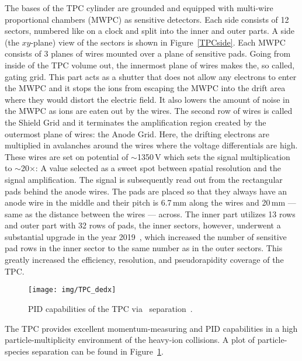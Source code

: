 The bases of the TPC cylinder are grounded and equipped with multi-wire proportional chambers
(MWPC) as sensitive detectors. Each side consists of 12 sectors, numbered like on a clock and split into 
the inner and outer parts. A side (the $xy$-plane) view of the sectors is shown in Figure~\ref{TPCside}\@. Each MWPC consists of 3 planes of wires mounted over a plane of sensitive pads. Going from inside of the TPC volume out, the innermost plane of wires makes the, so called, gating grid. This part acts as a shutter that does not allow any electrons to enter the MWPC and it stops the ions from escaping the MWPC into the drift area where they would distort the electric field. It also lowers the amount of noise in the MWPC as ions are eaten out by the wires. The second row of wires is called the Shield Grid and it terminates the amplification region created by the outermost plane of wires: the Anode Grid. Here, the drifting electrons are multiplied in avalanches around the wires where the voltage differentials are high. These wires are set on potential of $\sim$1350$\,$V which sets the signal multiplication to $\sim$20$\times$\@: A value selected as a sweet spot between spatial resolution and the signal amplification. The signal is subsequently read out from the rectangular pads behind the anode wires. The pads are placed so that they always have an anode wire in the middle and their pitch is 6.7$\,$mm along the wires and 20$\,$mm --- same as the distance between the wires --- across. The inner part utilizes 13 rows and outer part with 32 rows of pads, the inner sectors, however, underwent a substantial 
upgrade in the year 2019~\cite{iTPC}, which increased the number of sensitive pad rows in the inner sector to the same number as in the outer sectors. This greatly
increased the efficiency, resolution, and pseudorapidity coverage of the TPC\@.

\begin{figure}[!htb]
\begin{center}
 \texttt{[image: img/TPC\_dedx]}\\
\end{center}
\caption{\label{TpcPid}PID capabilities of the TPC via \dedx\ separation~\cite{TpcNim}.}
\end{figure}

The TPC provides excellent momentum-measuring and PID capabilities in a high particle-multiplicity environment of the heavy-ion collisions.
A plot of particle-species separation can be found in Figure~\ref{TpcPid}.

